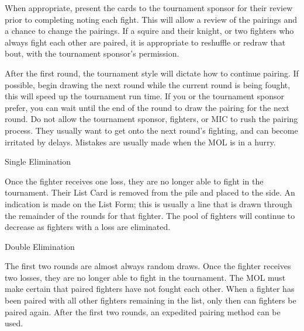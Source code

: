 \documentclass{article}
\begin{document}
When appropriate, present the cards to the tournament sponsor for their review prior to completing noting
each fight. This will allow a review of the pairings and a chance to change the pairings. If a squire and
their knight, or two fighters who always fight each other are paired, it is appropriate to reshuffle or redraw
that bout, with the tournament sponsor’s permission.

After the first round, the tournament style will dictate how to continue pairing. If possible, begin drawing
the next round while the current round is being fought, this will speed up the tournament run time. If you
or the tournament sponsor prefer, you can wait until the end of the round to draw the pairing for the next
round. Do not allow the tournament sponsor, fighters, or MIC to rush the pairing process. They usually
want to get onto the next round’s fighting, and can become irritated by delays. Mistakes are usually made
when the MOL is in a hurry.


Single Elimination

Once the fighter receives one loss, they are no longer able to fight in the tournament. Their List Card is
removed from the pile and placed to the side. An indication is made on the List Form; this is usually a line
that is drawn through the remainder of the rounds for that fighter. The pool of fighters will continue to
decrease as fighters with a loss are eliminated.

Double Elimination

The first two rounds are almost always random draws. Once the fighter receives two losses, they are no
longer able to fight in the tournament. The MOL must make certain that paired fighters have not fought
each other. When a fighter has been paired with all other fighters remaining in the list, only then can
fighters be paired again. After the first two rounds, an expedited pairing method can be used.
\end{document}

